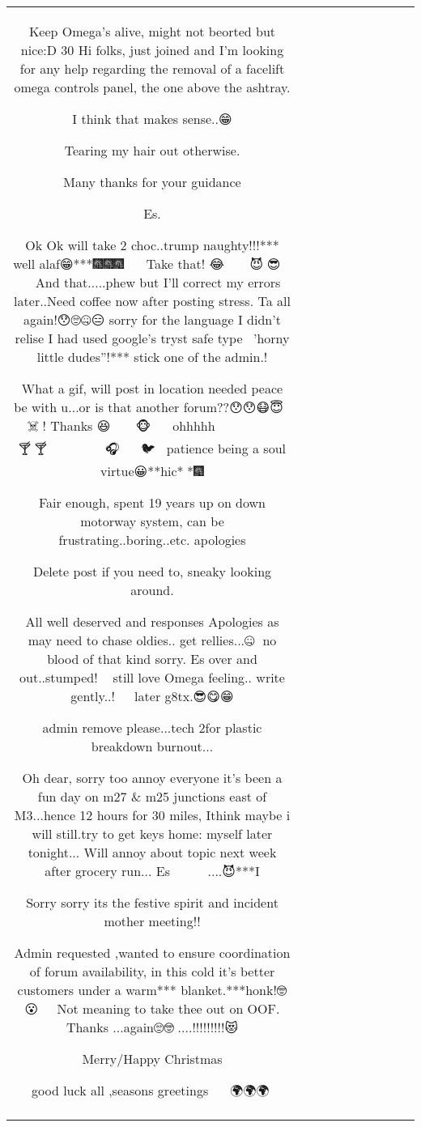 \begin{table}[h!]
\begin{tabular}{|c|c|c|c|c|c|c|c|c|c|}
{Keep Omega's alive, might not beorted but nice:D
30
Hi folks, just joined and I'm looking for any help regarding the removal of a facelift omega controls panel, the one above the ashtray.

I think that makes sense..😁

Tearing my hair out otherwise.


Many thanks for your guidance


Es.    

Ok Ok will take 2 choc..trump naughty!!!*** well alaf😁***🎆🎆🎆🎄🐼🐼🐼🐼
Take that!
😂🎂🎉🍺🍷🤔🤔💀😈🤢😎🤪🤯🤔🤩🤐
And that.....phew but I'll correct my errors later..Need coffee now after posting stress. Ta all again!😯🙄🤐😑 sorry for the language I didn't relise I had used google's tryst safe type🤔😧😱'horny little dudes''!*** stick one of the admin.!

What a gif, will post in location needed peace be with u...or is that another forum??😯😯😷😇🐼🐔🐔🐔💀☠️🐀! Thanks 😆🐧🤠👻🐲🐍🐢🐢🐵🎃🎄🎅🎷🎉🤓ohhhhh 🐼🐼🐼😆🐶😷🤐😨🤠🙈🙉🙈🥑🙄🍰🍺🍺🍺🍾🍸🥃🍸🐌🐅🐷🐱🐔🐵🐽🐯🐲🐧🍾🎺😂🎺🎺😁🎧🇭🇰😧🌋😲🐨🐦🎈🥂 patience being a soul virtue😀**hic*🍴*🎆

Fair enough, spent 19 years up on down motorway system, can be frustrating..boring..etc. apologies

Delete post if you need to, sneaky looking around.

All well deserved and responses
Apologies as may need to chase oldies.. get rellies...🤐🤔 no blood of that kind sorry. 
Es over and out..stumped!🤕😯🤓 still love Omega feeling..  write gently..! 🤔😧😇 later g8tx.😎😋😁






admin remove please...tech 2for plastic breakdown burnout... 

Oh dear, sorry too annoy everyone it's been a fun day on m27 \& m25 junctions east of M3...hence 12 hours for 30 miles, Ithink maybe i will still.try to get keys home: myself later tonight...
Will annoy about topic next week after grocery run...
Es 🤔💀😇             🍾🤯🤣😓🙄....😈***I

Sorry sorry its the festive spirit and incident mother meeting!!


Admin requested ,wanted to ensure coordination of forum availability, in this cold it's better customers under a warm*** blanket.***honk!🤓😮👻🐲🐲🥂
Not meaning to take thee out on OOF.
Thanks ...again🙄🤓🏴....!!!!!!!!!😻

Merry/Happy Christmas

good luck all ,seasons greetings🎄🎄🎄🎄😇😁🌍🌍🌍🍻

}
\end{tabular}
\end{table}
